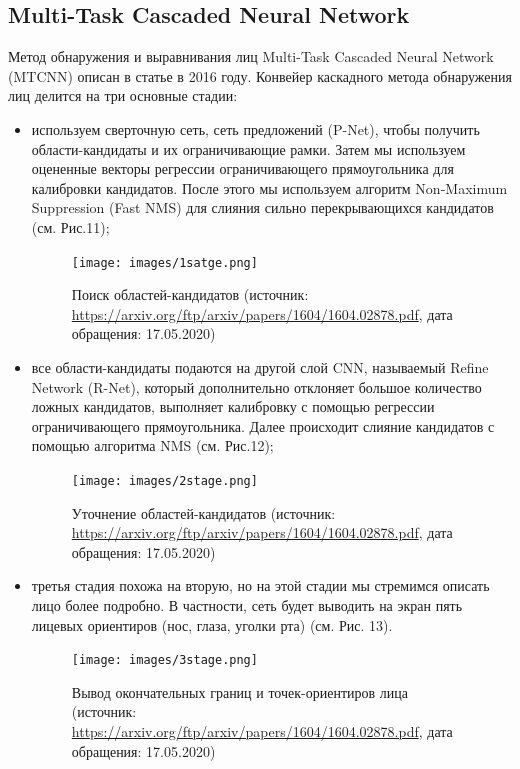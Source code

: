 \documentclass[14pt]{matmex-diploma-custom}
\begin{document}
    \subsection{Multi-Task Cascaded Neural Network}
    Метод обнаружения и выравнивания лиц Multi-Task Cascaded Neural Network (MTCNN) описан в статье \cite{mtcnn} в 2016 году. 
    Конвейер каскадного метода обнаружения лиц делится на три основные стадии:
    \begin{itemize}
        \item используем сверточную сеть, сеть предложений (P-Net), чтобы получить области-кандидаты и их ограничивающие рамки. Затем мы используем оцененные векторы регрессии ограничивающего прямоугольника для калибровки кандидатов. После этого мы используем алгоритм Non-Maximum Suppression (Fast NMS) \cite{non:maximum} для слияния сильно перекрывающихся кандидатов (см. Рис.11);
            \begin{figure}[H]
                        \centering
                        \texttt{[image: images/1satge.png]}
                        \caption{Поиск областей-кандидатов (источник: \url{https://arxiv.org/ftp/arxiv/papers/1604/1604.02878.pdf}, дата обращения: 17.05.2020)}
            \end{figure} 
        \item все области-кандидаты подаются на другой слой CNN, называемый Refine Network (R-Net), который дополнительно отклоняет большое количество ложных кандидатов, выполняет калибровку с помощью регрессии ограничивающего прямоугольника. Далее происходит слияние кандидатов с помощью алгоритма NMS (см. Рис.12);
            \begin{figure}[H]
                        \centering
                        \texttt{[image: images/2stage.png]}
                        \caption{Уточнение областей-кандидатов (источник: \url{https://arxiv.org/ftp/arxiv/papers/1604/1604.02878.pdf}, дата обращения: 17.05.2020)}
            \end{figure} 
            \item третья стадия похожа на вторую, но на этой стадии мы стремимся описать лицо более подробно. В частности, сеть будет выводить на экран пять лицевых ориентиров (нос, глаза, уголки рта) (см. Рис. 13).
            \begin{figure}[H]
                        \centering
                        \texttt{[image: images/3stage.png]}
                        \caption{Вывод окончательных границ и точек-ориентиров лица (источник: \url{https://arxiv.org/ftp/arxiv/papers/1604/1604.02878.pdf}, дата обращения: 17.05.2020)}
            \end{figure}
    \end{itemize}
    
\end{document}
